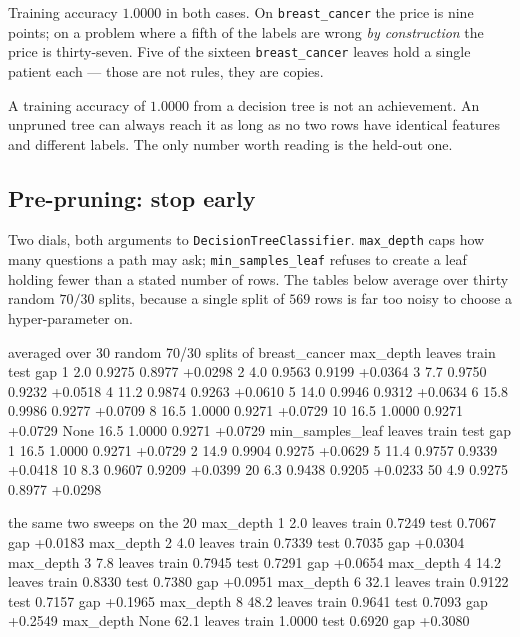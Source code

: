 \documentclass[11pt]{article}
\begin{document}
Training accuracy $1.0000$ in both cases. On \texttt{breast\_cancer} the price
is nine points; on a problem where a fifth of the labels are wrong \emph{by
construction} the price is thirty-seven. Five of the sixteen
\texttt{breast\_cancer} leaves hold a single patient each --- those are not
rules, they are copies.

\begin{keyidea}
A training accuracy of $1.0000$ from a decision tree is not an achievement.
An unpruned tree can always reach it as long as no two rows have identical
features and different labels. The only number worth reading is the held-out
one.
\end{keyidea}

\subsection{Pre-pruning: stop early}

Two dials, both arguments to \texttt{DecisionTreeClassifier}.
\texttt{max\_depth} caps how many questions a path may ask;
\texttt{min\_samples\_leaf} refuses to create a leaf holding fewer than a
stated number of rows. The tables below average over thirty random $70/30$
splits, because a single split of $569$ rows is far too noisy to choose a
hyper-parameter on.

\begin{codeout}
averaged over 30 random 70/30 splits of breast_cancer
max_depth   leaves   train    test     gap
   1           2.0   0.9275   0.8977   +0.0298
   2           4.0   0.9563   0.9199   +0.0364
   3           7.7   0.9750   0.9232   +0.0518
   4          11.2   0.9874   0.9263   +0.0610
   5          14.0   0.9946   0.9312   +0.0634
   6          15.8   0.9986   0.9277   +0.0709
   8          16.5   1.0000   0.9271   +0.0729
   10         16.5   1.0000   0.9271   +0.0729
   None       16.5   1.0000   0.9271   +0.0729
min_samples_leaf   leaves   train    test     gap
   1                 16.5   1.0000   0.9271   +0.0729
   2                 14.9   0.9904   0.9275   +0.0629
   5                 11.4   0.9757   0.9339   +0.0418
   10                 8.3   0.9607   0.9209   +0.0399
   20                 6.3   0.9438   0.9205   +0.0233
   50                 4.9   0.9275   0.8977   +0.0298
\end{codeout}
\begin{codeout}
the same two sweeps on the 20%
   max_depth 1        2.0 leaves  train 0.7249  test 0.7067  gap +0.0183
   max_depth 2        4.0 leaves  train 0.7339  test 0.7035  gap +0.0304
   max_depth 3        7.8 leaves  train 0.7945  test 0.7291  gap +0.0654
   max_depth 4       14.2 leaves  train 0.8330  test 0.7380  gap +0.0951
   max_depth 6       32.1 leaves  train 0.9122  test 0.7157  gap +0.1965
   max_depth 8       48.2 leaves  train 0.9641  test 0.7093  gap +0.2549
   max_depth None    62.1 leaves  train 1.0000  test 0.6920  gap +0.3080
\end{codeout}
\end{document}
